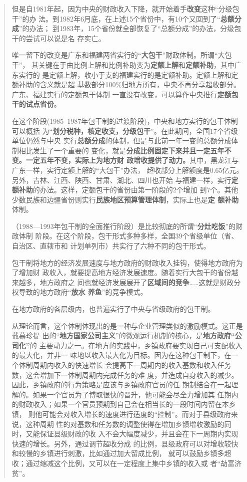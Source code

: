 \begin{quotation}
  但是自1981年起，因为中央的财政收入下降，就开始着手\textbf{改变}这种“分级包干”的办
  法。到1982年6月底，在上述15个省份中，有10个又回到了“\textbf{总额分成}”的办法；
  到1983年，15个省份就全部恢复了“总额分成”的办法，分级包干的尝试可以说是名
  存实亡。

  唯一留下的改变是广东和福建两省实行的“\textbf{大包干}”财政体制。所谓“大包干”，
  其关键在于由比例上解和比例补助变为\textbf{定额上解}和\textbf{定额补助}，其中广东实行的
  是定额上解，收小于支的福建实行的是定额补助。定额上解和定额补助的含义就是超
  基数部分100\%归地方所有，中央不再分享超收部分。广东、福建实行的定额包干体制
  一直没有改变，可以算作中央推行\textbf{定额包干的试点省份}。

  在这个阶段(1985--1987年包干制的过渡阶段)，中央和地方实行的包干体制可以概括
  为“\textbf{划分税种，核定收支，分级包干}”。在此期间，全国17个省级单位仍然与中央
  实行\textbf{总额分成}的体制，但是与此前一年一变的总额分成体制相比发生了一个重要的
  变化，就是\textbf{分成比例固定下来并且一定五年不变。一定五年不变，实际上为地方财
    政增收提供了动力。}其中，黑龙江与广东一样，实行定额上解的“大包干”办法，
  超收部分上解额度是0.65亿元。另外，吉林、江西、陕西、甘肃、湖北、四川也开始
  与福建一样，实行\textbf{定额补助}的办法。这样，定额包干的省份由第一阶段的2个增加
  到7个。其他少数民族和边疆省份则实行\textbf{民族地区预算管理体制}，实际上也是\textbf{定
    额补助}体制。\cite{yangdi}

  （1988—1993年包干制的全面推行阶段）是比较彻底的所谓“\textbf{分灶吃饭}”的财政体制
  阶段。在这个阶段，包干形式多种多样，全国39个省级单位（省、自治区、直辖市和
  计划单列市）共实行了六种不同的包干形式。

  包干制将地方的经济发展速度与地方政府的财政收入挂钩，使得地方政府为了增加财
  政收入，就要提高地方经济发展速度。随着实行大包干的省份越来越多，地方政府之
  间也就经济发展展开了\textbf{区域间的竞争}……这就是财政分权导致的地方政府“\textbf{放水
    养鱼}”的竞争模式。

  在地方政府的各层级内，也普遍实行了中央与省级政府的包干制。


  从理论而言，这个体制体现出的是一种与企业管理类似的激励模式。这正是戴慕珍提
  出的“\textbf{地方国家公司主义}”的微观运行机制的核心，是\textbf{地方政府“公司化”}的
  主要动力之一。在地方的实践中，乡镇政府要实现自己可支配收入的最大化，并非一
  味地以收入最大化为目标。因为在这种包干制下，在一个体制周期内收入的快速增长
  会提高下一周期内的收入基数和收入任务数，这会增加下一体制周期内完成任务的难
  度，并造成自身收入的减少。因此，乡镇政府的行为策略是应该与乡镇政府官员的任
  期制结合在一起理解的。如果一个官员为了博取很快的晋升，他可能会尽全力增加其
  任期内的财政收入；如果一个官员预期到自己会在相当长的一段时间内留在本乡镇，
  则他可能会对收入增长的速度进行适度的“控制”。而对于县级政府来说，这种周期
  性的对基数和任务数的调整使得在增加乡镇增收激励的同时，又能保证县级财政的收
  入不会大幅度减少，并且会在下一周期内实现快速的增长。另外，通过调节超收分成
  的比例，县级政府可以对增收较快和较慢的乡镇进行刺激，比如通过加大留成比例，
  就可以鼓励乡镇多超收；通过缩减这个比例，又可以在一定程度上集中乡镇的收入或
  者“劫富济贫”。
\end{quotation}

